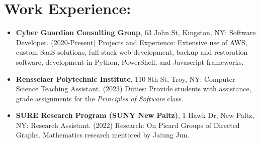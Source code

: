 \documentclass[11pt]{article}
\begin{document}
    \section*{Work Experience:}
    \begin{itemize}
        \itemsep0em 
        \item \textbf{Cyber Guardian Consulting Group}, 63 John St, Kingston, NY: Software Developer. 
            (2020-Present) Projects and Experience: Extensive use of AWS, custom SaaS solutions, 
            full stack web development, backup and restoration software, development in Python, PowerShell, 
            and Javascript frameworks.
        \item \textbf{Rensselaer Polytechnic Institute}, 110 8th St, Troy, NY: Computer Science Teaching Assistant. 
            (2023) Duties: Provide students with assistance, grade assignments for the \textit{Principles of Software} class.
        \item \textbf{SURE Research Program (SUNY New Paltz)}, 1 Hawk Dr, New Paltz, NY: Research Assistant. 
            (2022) Research: On Picard Groups of Directed Graphs. Mathematics research mentored by Jaiung Jun.
    \end{itemize}
\end{document}
